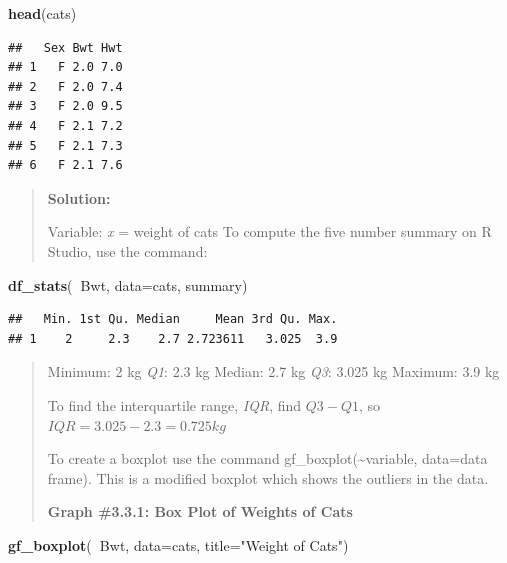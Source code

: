 \documentclass[]{book}
\newenvironment{Shaded}{\begin{snugshade}}{\end{snugshade}}
\newcommand{\DataTypeTok}[1]{\textcolor[rgb]{0.13,0.29,0.53}{#1}}
\newcommand{\KeywordTok}[1]{\textcolor[rgb]{0.13,0.29,0.53}{\textbf{#1}}}
\newcommand{\NormalTok}[1]{#1}
\newcommand{\OperatorTok}[1]{\textcolor[rgb]{0.81,0.36,0.00}{\textbf{#1}}}
\newcommand{\StringTok}[1]{\textcolor[rgb]{0.31,0.60,0.02}{#1}}
\begin{document}
\begin{Shaded}
\begin{Highlighting}[]
\KeywordTok{head}\NormalTok{(cats)}
\end{Highlighting}
\end{Shaded}

\begin{verbatim}
##   Sex Bwt Hwt
## 1   F 2.0 7.0
## 2   F 2.0 7.4
## 3   F 2.0 9.5
## 4   F 2.1 7.2
## 5   F 2.1 7.3
## 6   F 2.1 7.6
\end{verbatim}

\begin{quote}
\textbf{Solution:}

Variable: \emph{x} = weight of cats
To compute the five number summary on R Studio, use the command:
\end{quote}

\begin{Shaded}
\begin{Highlighting}[]
\KeywordTok{df_stats}\NormalTok{(}\OperatorTok{~}\NormalTok{Bwt, }\DataTypeTok{data=}\NormalTok{cats, summary)}
\end{Highlighting}
\end{Shaded}

\begin{verbatim}
##   Min. 1st Qu. Median     Mean 3rd Qu. Max.
## 1    2     2.3    2.7 2.723611   3.025  3.9
\end{verbatim}

\begin{quote}
Minimum: 2 kg
\emph{Q1}: 2.3 kg
Median: 2.7 kg
\emph{Q3}: 3.025 kg
Maximum: 3.9 kg

To find the interquartile range, \emph{IQR}, find \(Q3-Q1\), so \(IQR=3.025-2.3=0.725 kg\)

To create a boxplot use the command gf\_boxplot(\textasciitilde{}variable, data=data frame). This is a modified boxplot which shows the outliers in the data.

\textbf{Graph \#3.3.1: Box Plot of Weights of Cats}
\end{quote}

\begin{Shaded}
\begin{Highlighting}[]
\KeywordTok{gf_boxplot}\NormalTok{(}\OperatorTok{~}\NormalTok{Bwt, }\DataTypeTok{data=}\NormalTok{cats, }\DataTypeTok{title=}\StringTok{"Weight of Cats"}\NormalTok{)}
\end{Highlighting}
\end{Shaded}
\end{document}
